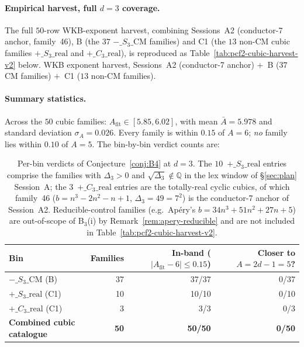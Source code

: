 \documentclass[11pt,a4paper]{article}
\theoremstyle{definition}
\theoremstyle{remark}
\newcommand{\Q}{\mathbb{Q}}
\begin{document}
\paragraph{Empirical harvest, full $d=3$ coverage.}
The full $50$-row WKB-exponent harvest, combining
Sessions~A2 (conductor-7 anchor, family~46),
B (the $37$ $-\_S_3\_\mathrm{CM}$ families) and
C1 (the $13$ non-CM cubic families
$+\_S_3\_\mathrm{real}$ and $+\_C_3\_\mathrm{real}$), is reproduced as
Table~\ref{tab:pcf2-cubic-harvest-v2} below.
WKB exponent harvest, Sessions~A2 (conductor-7 anchor)
$+$~B ($37$ CM families) $+$~C1 ($13$ non-CM families).



\paragraph{Summary statistics.}
Across the $50$ cubic families: $A_{\mathrm{fit}}\in[5.85, 6.02]$, with
mean $\bar{A}=5.978$ and standard deviation $\sigma_{A}=0.026$. Every
family is within $0.15$ of $A=6$; \emph{no} family lies within $0.10$
of $A=5$. The bin-by-bin verdict counts are:

\begin{table}[ht]
\centering
\small
\begin{tabular}{lrrr}
\toprule
Bin & Families & In-band ($|A_{\mathrm{fit}}-6|\le 0.15$) & Closer to $A=2d-1=5$? \\
\midrule
$-\_S_3\_\mathrm{CM}$ (B)        & 37 & 37/37 & 0/37 \\
$+\_S_3\_\mathrm{real}$ (C1)     & 10 & 10/10 & 0/10 \\
$+\_C_3\_\mathrm{real}$ (C1)     &  3 &  3/3  & 0/3 \\
\midrule
\textbf{Combined cubic catalogue} & \textbf{50} & \textbf{50/50} & \textbf{0/50} \\
\bottomrule
\end{tabular}
\caption{Per-bin verdicts of Conjecture~\ref{conj:B4} at $d=3$. The
$10$~$+\_S_3\_\mathrm{real}$ entries comprise the families with
$\Delta_{3}>0$ and $\sqrt{\Delta_{3}}\notin\Q$ in the lex window of
\S\ref{sec:plan} Session~A; the $3$~$+\_C_3\_\mathrm{real}$ entries are
the totally-real cyclic cubics, of which family~46
($b=n^{3}-2n^{2}-n+1$, $\Delta_3=49=7^{2}$) is the conductor-7 anchor
of Session~A2. Reducible-control families (e.g.\ Ap\'ery's
$b=34n^{3}+51n^{2}+27n+5$) are out-of-scope of B$_{3}$(i) by
Remark~\ref{rem:apery-reducible} and are not included in
Table~\ref{tab:pcf2-cubic-harvest-v2}.}
\label{tab:pcf2-bin-verdicts}
\end{table}
\end{document}
